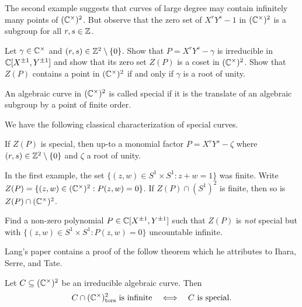 The second example suggests that curves of large degree may contain
infinitely many points of $({\mathbb{C}}^\times)^2$. But observe that the zero
set of $X^{r}Y^{s}-1$ in $({\mathbb{C}}^\times)^2$ is a subgroup for all
$r,s\in{\mathbb{Z}}$. 

\begin{exercise}
  \label{exer:infinitemany}
  Let $\gamma\in {\mathbb{C}}^\times$ and $(r,s)\in{\mathbb{Z}}^2\setminus
  \{0\}$. Show that $P=X^rY^s-\gamma$ is irreducible in ${\mathbb{C}}[X^{\pm
    1},Y^{\pm 1}]$ and show that its zero set $Z(P)$ is a coset in
  $({\mathbb{C}}^\times)^2$. Show that $Z(P)$ contains a point in
  $({\mathbb{C}}^\times)^2$ if and only if $\gamma$ is a root of unity. 
\end{exercise}

\begin{definition}
  An algebraic curve in $({\mathbb{C}}^\times)^2$
  is called special if it is the translate of an algebraic subgroup by
  a point of finite order. 
\end{definition}

We have the following classical characterization of special curves. 

\begin{lemma}
  If $Z(P)$ is special, then up-to a monomial factor
  $P=X^rY^s-\zeta$ where $(r,s)\in{\mathbb{Z}}^2\setminus\{0\}$
  and $\zeta$ a root of unity. 
\end{lemma}


In the first example, the set $\{(z,w) \in S^1\times S^1 : z+w=1\}$
was finite. Write $Z(P) = \{(z,w) \in ({\mathbb{C}}^\times)^2 : P(z,w)=0\}$. If
$Z(P)\cap (S^1)^2$ is finite, then so is $Z(P) \cap ({\mathbb{C}}^\times)^2$.

\begin{exercise}
  \label{exer:toralpoly}
  Find a non-zero polynomial $P\in {\mathbb{C}}[X^{\pm 1},Y^{\pm 1}]$ such that
  $Z(P)$ is \emph{not} special but with $\{(z,w)\in S^1 \times S^1 :
  P(z,w)=0\}$ uncountable infinite.  
\end{exercise}

Lang's paper contains a proof of the follow theorem which he
attributes to Ihara, Serre, and Tate.

\begin{theorem}
  \label{thm:ist}
  Let $C\subseteq ({\mathbb{C}}^\times)^2$ be an irreducible algebraic curve.
  Then
  \begin{equation*}
    C \cap ({\mathbb{C}}^\times)^2_{\mathrm{tors}}\text{ is infinite}\quad\Longleftrightarrow\quad \text{$C$ is special}. 
  \end{equation*}
\end{theorem}

